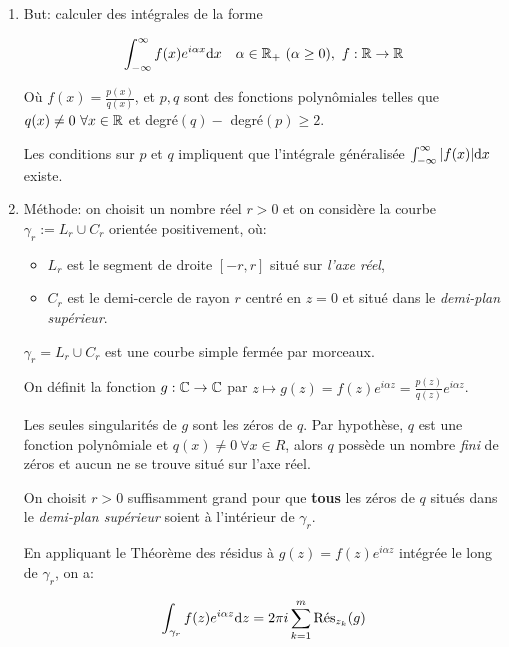 \begin{enumerate}
\item But: calculer des intégrales de la forme

\[ \int_{-\infty}^\infty f(x) e^{i\alpha x} \dx \quad \alpha \in \R_+ \ (\alpha \geq 0),\ f: \R \rightarrow \R \]

Où $f(x) = \frac{p(x)}{q(x)}$, et $p, q$ sont des fonctions polynômiales telles que $q(x) \neq 0 \ \forall x \in \R$ et degré$(q) - $ degré$(p) \geq 2$.

\begin{remark}
    Les conditions sur $p$ et $q$ impliquent que l'intégrale généralisée $\int_{-\infty}^\infty |f(x)| \dx$ existe.
\end{remark}

\item Méthode: on choisit un nombre réel $r > 0$ et on considère la courbe $\gamma_r := L_r \cup C_r$ orientée positivement, où:

\begin{itemize}
    \item $L_r$ est le segment de droite $[-r,r]$ situé sur \textit{l'axe réel},
    \item $C_r$ est le demi-cercle de rayon $r$ centré en $z = 0$ et situé dans le \textit{demi-plan supérieur}.
\end{itemize}

$\gamma_r = L_r \cup C_r$ est une courbe simple fermée par morceaux.

On définit la fonction $g: \Cx \rightarrow \Cx$ par $z \mapsto g(z) = f(z) e^{i\alpha z} = \frac{p(z)}{q(z)} e^{i\alpha z}$.

\begin{constatation}
    Les seules singularités de $g$ sont les zéros de $q$.
    Par hypothèse, $q$ est une fonction polynômiale et $q(x) \neq 0 \ \forall x \in R$, alors $q$ possède un nombre \textit{fini} de zéros et aucun ne se trouve situé sur l'axe réel.
\end{constatation}

\begin{idea}
    On choisit $r > 0$ suffisamment grand pour que \textbf{tous} les zéros de $q$ situés dans le \textit{demi-plan supérieur} soient à l'intérieur de $\gamma_r$.
\end{idea}

En appliquant le Théorème des résidus à $g(z) = f(z) e^{i\alpha z}$ intégrée le long de $\gamma_r$, on a:

\[ \int_{\gamma_r} f(z) e^{i\alpha z} \dz = 2\pi i \sum_{k = 1}^m \Res_{z_k}(g) \]


\end{enumerate}
